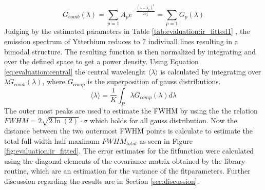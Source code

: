 \begin{equation}
    G_{comb}(\lambda) = \sum_{p = 1} A_p e^{-\frac{(\lambda - \lambda_p)^{2}}{2 \sigma_{p}^2}}  = \sum_{p = 1} G_p(\lambda)
    \label{eq:evaluation:fitfunc}
\end{equation}
Judging by the estimated parameters in Table \ref{tab:evaluation:ir_fitted1} , the emission spectrum of Ytterbium reduces to 7 indiviuall lines resulting in a bimodal structure.
The resulting function is then normalized by integrating and over the defined space to get a power density.
Using Equation \ref{eq:evaluation:central} the central wavelenght $\langle \lambda \rangle$ is calculated by integrating over $\lambda G_{comb}(\lambda)$, where $G_{comp}$ is the superposition of gauss distributions. 
\begin{equation}
    \langle \lambda \rangle = \frac{1}{K} \int_{P}\lambda G_{comp}(\lambda) d \lambda
    \label{eq:evaluation:central}
\end{equation}
The outer most peaks are used to estimate the FWHM by using the the relation $FWHM = 2 \sqrt{2 \ln(2)} \cdot \sigma$ which holds for all gauss distribution.
Now the distance between the two outermost FWHM points is calculate to estimate the total full width half maximum $FWHM_{total}$ as seen in Figure \ref{fig:evaluation:ir_fitted}.
The error estimates for the fitfunction were calculated using the diagonal elements of the covariance matrix obtained by the library routine, which are an estimation for the variance of the fitparameters.
Further discussion regarding the results are in Section \ref{sec:discussion}.
